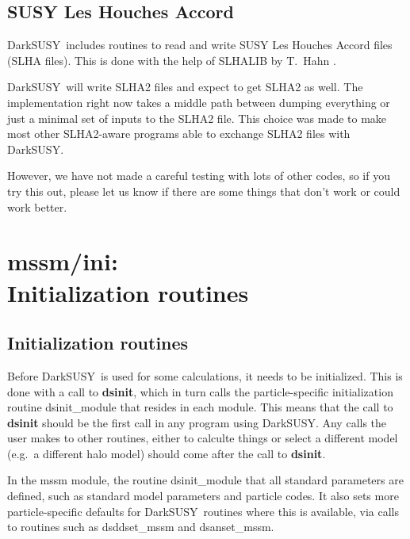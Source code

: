 \documentclass[a4paper,10pt,oneside]{book}
\newcommand{\code}[1]{\ft{#1}}
\newcommand{\codeb}[1]{\ftb{#1}}
\newcommand{\ds}{{\sffamily DarkSUSY}}
\newcommand{\ft}[1]{\textsf{#1}}
\newcommand{\ftb}[1]{{\bfseries \sffamily #1}}
\begin{document}

\subsection{SUSY Les Houches Accord}

\ds\ includes routines to read and write SUSY Les Houches Accord 
\cite{Skands:2003cj,Allanach:2008qq} files (SLHA
files). This is done with the help of \code{SLHALIB} by T.~Hahn \cite{Hahn:2006nq}.

\ds\ will write SLHA2 files and expect to get SLHA2 as well. The implementation
right now takes a middle path between dumping everything or just
a minimal set of inputs to the SLHA2 file. This choice was made to make most
other SLHA2-aware programs able to exchange SLHA2 files with \ds.

However, we have not made a careful testing with lots of other codes, so
if you try this out, please let us know if there are some things that don't
work or could work better.


\section[mssm/ini: Initialization routines]{\codeb{mssm/ini}:\\ Initialization routines}
\label{sec:src_models/mssm/ini}


\subsection{Initialization routines}

Before \ds\ is used for some calculations, it needs to be
initialized. This is done with a call to \codeb{dsinit}, 
which in turn calls the particle-specific initialization routine 
\code{dsinit\_module} that resides in each module.
This means that the call to \codeb{dsinit} should be the first call in
any program using \ds. Any calls the user makes to other routines,
either to calculte things or select a different model (e.g.\ a
different halo model) should come after the call to \codeb{dsinit}.

In the \code{mssm} module, the routine \code{dsinit\_module}  that all standard parameters 
are defined, such as standard model parameters and particle codes.
 It also sets more particle-specific defaults for \ds\ routines where this is
 available, via calls to routines such as \code{dsddset\_mssm}  
 and \code{dsanset\_mssm}.
\end{document}

